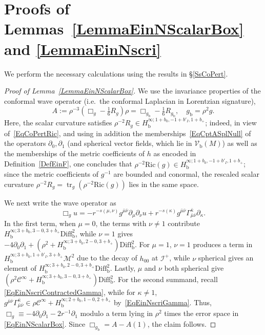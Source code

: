 \documentclass[reqno,11pt,letterpaper]{amsart}
\numberwithin{equation}{section}
\numberwithin{figure}{section}
\theoremstyle{definition}
\theoremstyle{remark}
\newcommand{\mc}{\mathcal}
\newcommand{\cC}{\mc C}
\newcommand{\cM}{\mc M}
\newcommand{\ms}{\mathscr}
\newcommand{\scri}{\ms I}
\newcommand{\tr}{\operatorname{tr}}
\newcommand{\pa}{\partial}
\newcommand{\bop}{{\mathrm{b}}}
\newcommand{\Diff}{\mathrm{Diff}}
\newcommand{\Vf}{\mathcal V}
\newcommand{\Vb}{\Vf_\bop}
\newcommand{\Diffb}{\Diff_\bop}
\newcommand{\CI}{\cC^\infty}
\newcommand{\Hb}{H_{\bop}}
\newcommand{\Ric}{\mathrm{Ric}}
\newcommand{\usref}[1]{{\upshape\ref{#1}}}
\begin{document}
\section{Proofs of Lemmas~\ref{LemmaEinNScalarBox} and \ref{LemmaEinNscri}}
\label{SAppEinN}

We perform the necessary calculations using the results in \S\ref{SsCoPert}. 

\begin{proof}[Proof of Lemma~\usref{LemmaEinNScalarBox}]
  We use the invariance properties of the conformal wave operator (i.e.\ the conformal Laplacian in Lorentzian signature),
  \[
    A:=\rho^{-3}(\Box_g-\tfrac16 R_g)\rho = \Box_{g_\bop}-\tfrac16 R_{g_\bop},\quad g_\bop=\rho^2 g.
  \]
  Here, the scalar curvature satisfies $\rho^{-2}R_g\in\Hb^{\infty;1+b_0,-1+b'_I,1+b_+}$; indeed, in view of~\eqref{EqCoPertRic}, and using in addition the memberships~\eqref{EqCptASplNull} of the operators $\pa_0,\pa_1$ (and spherical vector fields, which lie in $\Vb(M)$) as well as the memberships of the metric coefficients of $h$ as encoded in Definition~\ref{DefEinF}, one concludes that $\rho^{-2}\Ric(g)\in\Hb^{\infty;1+b_0,-1+b'_I,1+b_+}$; since the metric coefficients of $g^{-1}$ are bounded and conormal, the rescaled scalar curvature $\rho^{-2}R_g=\tr_g(\rho^{-2}\Ric(g))$ lies in the same space.
  
  We next write the wave operator as
  \[
    \Box_g u = -r^{-s(\mu,\nu)}g^{\bar\mu\bar\nu}\pa_\mu\pa_\nu u + r^{-s(\kappa)}g^{\bar\mu\bar\nu}\Gamma_{\bar\mu\bar\nu}^{\bar\kappa}\pa_\kappa.
  \]
  In the first term, when $\mu=0$, the terms with $\nu\neq 1$ contribute $\Hb^{\infty;3+b_0,3-0,3+b_+}\Diffb^2$, while $\nu=1$ gives $-4\pa_0\pa_1+(\rho^2+\Hb^{\infty;3+b_0,2-0,3+b_+})\Diffb^2$. For $\mu=1$, $\nu=1$ produces a term in $\Hb^{\infty;3+b_0,1+b'_I,3+b_+}\cM^2$ due to the decay of $h_{0 0}$ at $\scri^+$, while $\nu$ spherical gives an element of $\Hb^{\infty;3+b_0,2-0,3+b_+}\Diffb^2$. Lastly, $\mu$ and $\nu$ both spherical give $(\rho^2\CI+\Hb^{\infty;3+b_0,3-0,3+b_+})\Diffb^2$. For the second summand, recall \eqref{EqEinNscriContractedGamma}, while for $\kappa\neq 1$, $g^{\bar\mu\bar\nu}\Gamma_{\bar\mu\bar\nu}^{\bar\kappa}\in\rho\CI+\Hb^{\infty;2+b_0,1-0,2+b_+}$ by~\eqref{EqEinNscriGamma}. Thus, $\Box_g\equiv -4\pa_0\pa_1-2 r^{-1}\pa_1$ modulo a term lying in $\rho^2$ times the error space in \eqref{EqEinNScalarBox}. Since $\Box_{g_\bop}=A-A(1)$, the claim follows.
\end{proof}
\end{document}
